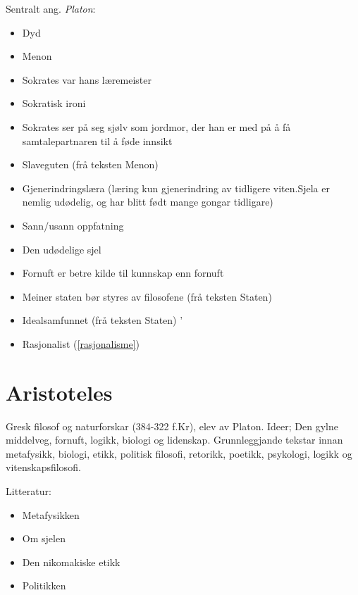 \documentclass[a4paper]{IEEEtran}
\begin{document}
Sentralt ang. \textit{Platon}:
\begin{itemize}
    \bigskip
    
    \item Dyd
    \item Menon
    \item Sokrates var hans læremeister
    \item Sokratisk ironi
    \item Sokrates ser på seg sjølv som jordmor, der han er med på å få samtalepartnaren til å føde innsikt
    \item Slaveguten (frå teksten Menon)
    \item Gjenerindringslæra (læring kun gjenerindring av tidligere viten.Sjela er nemlig udødelig, og har blitt født mange gongar tidligare)
    \item Sann/usann oppfatning
    \item Den udødelige sjel
    \item Fornuft er betre kilde til kunnskap enn fornuft
    \item Meiner staten bør styres av filosofene (frå teksten Staten)
    \item Idealsamfunnet (frå teksten Staten)
    '\item Rasjonalist (\ref{rasjonalisme})
     
\end{itemize}\bigskip

\section{Aristoteles}
\label{aristoteles}\bigskip

Gresk filosof og naturforskar (384-322 f.Kr), elev av Platon. Ideer; Den gylne middelveg, fornuft, logikk, biologi og lidenskap. Grunnleggjande tekstar innan metafysikk, biologi, etikk, politisk filosofi, retorikk, poetikk, psykologi, logikk og vitenskapsfilosofi.
\bigskip

Litteratur:
\begin{itemize}
    \item Metafysikken
    \item Om sjelen
    \item Den nikomakiske etikk
    \item Politikken
\end{itemize}\bigskip 
\end{document}
